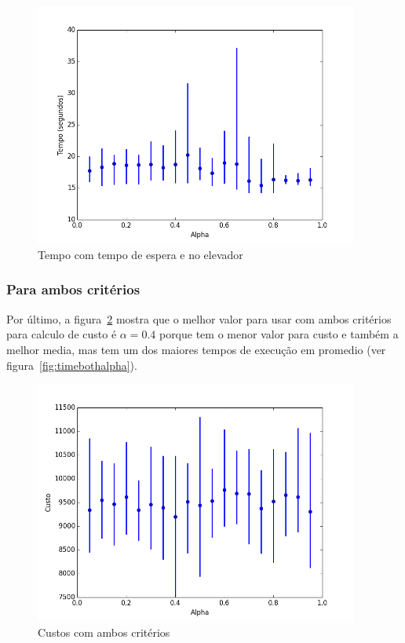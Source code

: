 		\begin{figure}[H]
			\centering
			\includegraphics[height=8cm]{images/time_waitingTime_alpha}
			\caption{Tempo com tempo de espera e no elevador}
			\label{fig:timewaitingalpha}
		\end{figure}
	
	\subsubsection{Para ambos critérios}
		Por último, a figura~\ref{fig:costbothalpha} mostra que o melhor valor para usar com ambos critérios para calculo de custo é $\alpha = 0.4$ porque tem o menor valor para custo e também a melhor media, mas tem um dos maiores tempos de execução em promedio (ver figura~\ref{fig:timebothalpha}).
		
		\begin{figure}[H]
			\centering
			\includegraphics[height=8cm]{images/cost_both_alpha}
			\caption{Custos com ambos critérios}
			\label{fig:costbothalpha}
		\end{figure}
		
